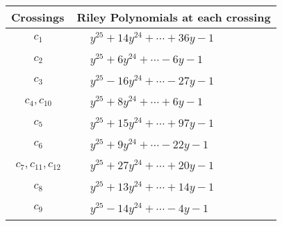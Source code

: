 \documentclass[1p]{elsarticle_modified}
\theoremstyle{definition}
\begin{document}
\begin{tabular}{m{50pt}|m{274pt}}
Crossings & \hspace{64pt}Riley Polynomials at each crossing \\
\hline $$\begin{aligned}c_{1}\end{aligned}$$&$\begin{aligned}
&y^{25}+14 y^{24}+\cdots+36 y-1
\end{aligned}$\\
\hline $$\begin{aligned}c_{2}\end{aligned}$$&$\begin{aligned}
&y^{25}+6 y^{24}+\cdots-6 y-1
\end{aligned}$\\
\hline $$\begin{aligned}c_{3}\end{aligned}$$&$\begin{aligned}
&y^{25}-16 y^{24}+\cdots-27 y-1
\end{aligned}$\\
\hline $$\begin{aligned}c_{4},c_{10}\end{aligned}$$&$\begin{aligned}
&y^{25}+8 y^{24}+\cdots+6 y-1
\end{aligned}$\\
\hline $$\begin{aligned}c_{5}\end{aligned}$$&$\begin{aligned}
&y^{25}+15 y^{24}+\cdots+97 y-1
\end{aligned}$\\
\hline $$\begin{aligned}c_{6}\end{aligned}$$&$\begin{aligned}
&y^{25}+9 y^{24}+\cdots-22 y-1
\end{aligned}$\\
\hline $$\begin{aligned}c_{7},c_{11},c_{12}\end{aligned}$$&$\begin{aligned}
&y^{25}+27 y^{24}+\cdots+20 y-1
\end{aligned}$\\
\hline $$\begin{aligned}c_{8}\end{aligned}$$&$\begin{aligned}
&y^{25}+13 y^{24}+\cdots+14 y-1
\end{aligned}$\\
\hline $$\begin{aligned}c_{9}\end{aligned}$$&$\begin{aligned}
&y^{25}-14 y^{24}+\cdots-4 y-1
\end{aligned}$\\
\hline
\end{tabular}\\~\\
\end{document}
